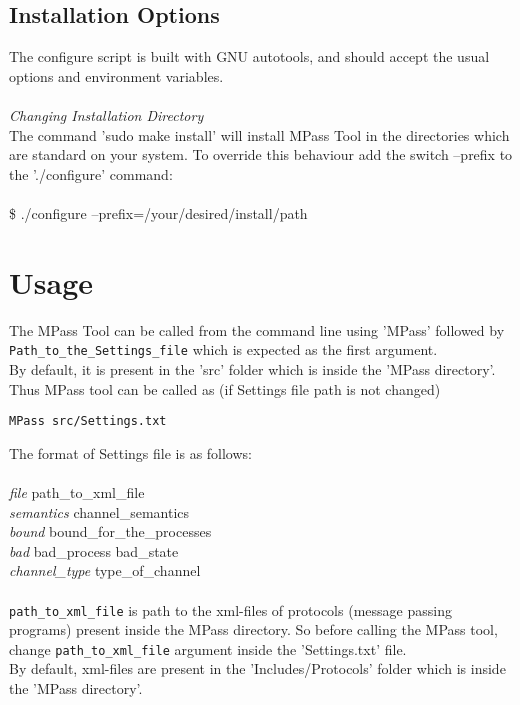 \documentclass[a4paper]{article}
\begin{document}
\subsection{Installation Options}


The configure script is built with GNU autotools, and should accept the usual
options and environment variables.
\\
\\
\emph{Changing Installation Directory} 
\\
The command ’sudo make install’ will install MPass Tool in the directories which are standard on your system. To override this behaviour add the switch
--prefix to the ’./configure’ command:
\\
\\
\hspace*{5mm}\$ ./configure --prefix=/your/desired/install/path

\section{Usage}
The MPass Tool can be called from the command line using 'MPass' followed by {\tt Path\_to\_the\_Settings\_file} which is expected as the first argument.\\
By default, it is present in the 'src' folder which is inside the 'MPass directory'.\\
Thus MPass tool can be called as (if Settings file path is not changed)
\begin{verbatim}
MPass src/Settings.txt
\end{verbatim}
The format of Settings file is as follows:
\\
\\
\hspace*{15mm}\emph{file} \hspace*{20mm}     path\_to\_xml\_file
\\
\hspace*{15mm}\emph{semantics} \hspace*{9mm}    channel\_semantics
\\
\hspace*{15mm}\emph{bound} \hspace*{15mm} bound\_for\_the\_processes
\\
\hspace*{15mm}\emph{bad}   \hspace*{19mm}   bad\_process   bad\_state
\\
\hspace*{15mm}\emph{channel\_type}  \hspace*{5mm}   type\_of\_channel
\\\\
{\tt path\_to\_xml\_file} is path to the xml-files of protocols (message passing programs) present inside the MPass directory. So before calling the MPass tool, change {\tt path\_to\_xml\_file} argument inside the 'Settings.txt' file.\\
By default, xml-files are present in the 'Includes/Protocols' folder which is inside the 'MPass directory'.
\end{document}
